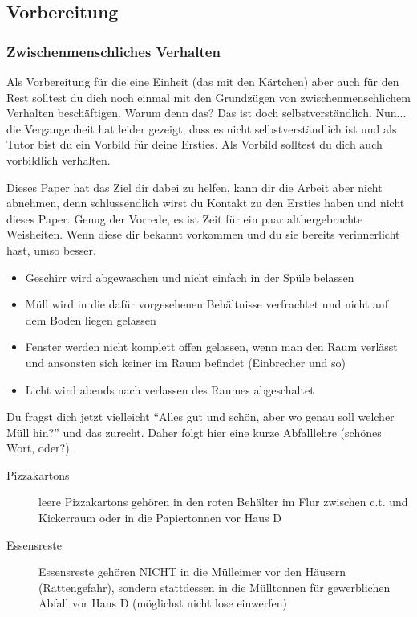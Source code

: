 \documentclass[a4paper,11pt]{scrartcl} %
\newenvironment{myitemize}{\begin{itemize}\itemsep -2pt}{\end{itemize}} %
\begin{document}
  \subsection{Vorbereitung} %
\subsubsection*{Zwischenmenschliches Verhalten}

Als Vorbereitung für die eine Einheit (das mit den Kärtchen) aber auch für den Rest solltest du dich noch einmal mit den Grundzügen von zwischenmenschlichem Verhalten beschäftigen. Warum denn das? Das ist doch selbstverständlich.
Nun... die Vergangenheit hat leider gezeigt, dass es nicht selbstverständlich ist und als Tutor bist du ein Vorbild für deine Ersties. Als Vorbild solltest du dich auch vorbildlich verhalten.

Dieses Paper hat das Ziel dir dabei zu helfen, kann dir die Arbeit aber nicht abnehmen, denn schlussendlich wirst du Kontakt zu den Ersties haben und nicht dieses Paper. Genug der Vorrede, es ist Zeit für ein paar althergebrachte Weisheiten. Wenn diese dir bekannt vorkommen und du sie bereits verinnerlicht hast, umso besser.

\begin{myitemize}
	\item Geschirr wird abgewaschen und nicht einfach in der Spüle belassen
	\item Müll wird in die dafür vorgesehenen Behältnisse verfrachtet und nicht auf dem Boden liegen gelassen
	\item Fenster werden nicht komplett offen gelassen, wenn man den Raum verlässt und ansonsten sich keiner im Raum befindet (Einbrecher und so)
	\item Licht wird abends nach verlassen des Raumes abgeschaltet
\end{myitemize}

Du fragst dich jetzt vielleicht "`Alles gut und schön, aber wo genau soll welcher Müll hin?"' und das zurecht. Daher folgt hier eine kurze Abfalllehre (schönes Wort, oder?).

\begin{description}
	\item[Pizzakartons] leere Pizzakartons gehören in den roten Behälter im Flur zwischen c.t. und Kickerraum oder in die Papiertonnen vor Haus D
	\item[Essensreste] Essensreste gehören NICHT in die Mülleimer vor den Häusern (Rattengefahr), sondern stattdessen in die Mülltonnen für gewerblichen Abfall vor Haus D (möglichst nicht lose einwerfen)
\end{description}
\end{document}
